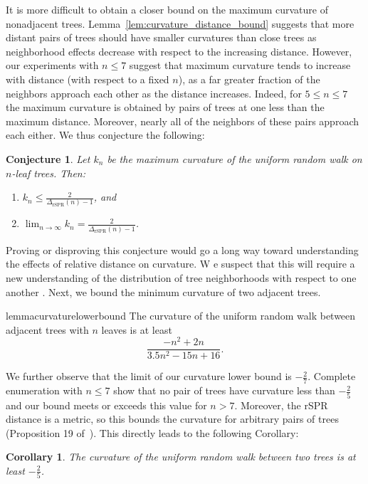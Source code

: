 \documentclass[11pt,onecolumn,conference]{IEEEtran}
\newtheorem{corollary}[theorem]{Corollary}
\newtheorem{conjecture}[theorem]{Conjecture}
\newcommand{\cuttable}[2][]{%
    \ifthenelse{\equal{#1}{}}%
		{}%
		{#1}%
}
\begin{document}
It is more difficult to obtain a closer bound on the maximum curvature of nonadjacent trees.
Lemma~\ref{lem:curvature_distance_bound} suggests that more distant pairs of trees should have smaller curvatures than close trees as neighborhood effects decrease with respect to the increasing distance.
However, our experiments with $n \le 7$ suggest that maximum curvature tends to increase with distance (with respect to a fixed $n$), as a far greater fraction of the neighbors approach each other as the distance increases.
Indeed, for $5 \le n \le 7$ the maximum curvature is obtained by pairs of trees at one less than the maximum distance.
Moreover, nearly all of the neighbors of these pairs approach each either.
We thus conjecture the following:
\begin{conjecture}
	Let $k_n$ be the maximum curvature of the uniform random walk on $n$-leaf trees.
	Then:
	\begin{enumerate}
		\item $k_n \le \frac{2}{\Delta_{\text{rSPR}}(n)-1}$, and
		\item $\lim_{n\rightarrow\infty} k_n  = \frac{2}{\Delta_{\text{rSPR}}(n)-1}$.
	\end{enumerate}
\end{conjecture}
Proving or disproving this conjecture would go a long way toward understanding the effects of relative distance on curvature.
\cuttable[W]{However, w}e suspect that this will require a \cuttable[new]{greater} understanding of the distribution of tree neighborhoods with respect to one another\cuttable{ than is currently known}.
Next, we bound the minimum curvature of two adjacent trees.

\begin{restatable}{lemma}{curvaturelowerbound}
\label{lem:curvature_lower_bound}
	The curvature of the uniform random walk between adjacent trees with $n$ leaves is at least
	$$\frac{-n^2 + 2n}{3.5n^2 - 15n + 16}.$$
\end{restatable}

We further observe that the limit of our curvature lower bound is $-\frac{2}{7}$.
Complete enumeration with $n \le 7$ show that no pair of trees have curvature less than $-\frac{2}{5}$ and our bound meets or exceeds this value for $n > 7$.
Moreover, the rSPR distance is a metric, so this bounds the curvature for arbitrary pairs of trees (Proposition 19 of~\cite{Ollivier2009-bw}).
This directly leads to the following Corollary:

\begin{corollary}
	The curvature of the uniform random walk between two trees is at least $-\frac{2}{5}$.
\end{corollary}
\end{document}
